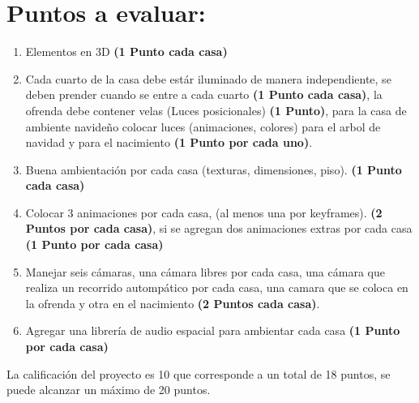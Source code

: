 \documentclass[12pt,letterpaper]{article}
\begin{document}
\section*{Puntos a evaluar:}
\begin{enumerate}
\item Elementos en 3D \textbf{(1 Punto cada casa)}
\item Cada cuarto de la casa debe estár iluminado de manera independiente, se deben prender cuando se entre a cada cuarto \textbf{(1 Punto cada casa)}, la ofrenda debe contener velas (Luces posicionales) \textbf{(1 Punto)}, para la casa de ambiente navideño colocar luces (animaciones, colores) para el arbol de navidad y para el nacimiento \textbf{(1 Punto por cada uno)}.
\item Buena ambientación por cada casa (texturas, dimensiones, piso). \textbf{(1 Punto cada casa)}
\item Colocar 3 animaciones por cada casa, (al menos una por keyframes). \textbf{(2 Puntos por cada casa)}, si se agregan dos animaciones extras por cada casa \textbf{(1 Punto por cada casa)}
\item Manejar seis cámaras, una cámara libres por cada casa, una cámara que realiza un recorrido autompático por cada casa, una camara que se coloca en la ofrenda y otra en el nacimiento \textbf{(2 Puntos cada casa)}.
\item Agregar una librería de audio espacial para ambientar cada casa \textbf{(1 Punto por cada casa)}
\end{enumerate}

La calificación del proyecto es 10 que corresponde a un total de 18 puntos, se puede alcanzar un máximo de 20 puntos.
\end{document}
